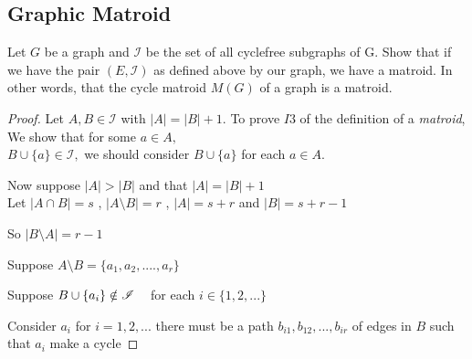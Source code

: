 \documentclass[../main.tex]{subfiles}
\begin{document}
\subsection{Graphic Matroid} 
\begin{thm}
\noindent Let $G$ be a graph and $\mathcal{I}$ be the set of all cyclefree subgraphs of G.
Show that if we have the pair $(E,\mathcal{I})$ as defined above by our graph, we have a matroid. In other words, that the cycle matroid $M(G)$ of a graph is a matroid.
\end{thm} 
\begin{proof}
 Let $A,B \in \mathcal{I}$ with $|A|=|B|+1.$
 \noindent To prove $ I3 $ of the definition of a \textit{matroid}, We show that for some $a \in A ,$\\$ B \cup \{a\} \in \mathcal{I},$  we should consider $B \cup \{a\}$ for each $a \in A.$ 
 
 \noindent Now suppose $ |A|  >  |B| $ and that $|A|  =  |B| + 1$\\
 Let 
 $ |A \cap B| = s $ , $ |A \setminus B| = r$ ,
 $ |A| = s + r $ and $ |B| = s + r - 1$ 
 
\noindent So $ |B \setminus A| = r - 1$
 
 \noindent Suppose $ A \setminus B = \{ a_1, a_2, .... , a_r \} $ 
 
 \noindent Suppose $ B \cup \{ a_i \} \notin \mathcal{I} \hspace{3mm} $ for each $ i \in \{ 1,2,... \}$
 
 \noindent Consider $ a_i $ for $ i = 1, 2,... $ there must be a path $ b_{i1}, b_{12}, ... , b_{ir} $ of edges in $B$ such that $ a_i $ make a cycle
  
 \begin{minipage}{.2\textwidth}
 \end{minipage}
\hspace{4cm} \begin{minipage}{.2\textwidth}
\end{minipage}
\end{proof}
\end{document}
